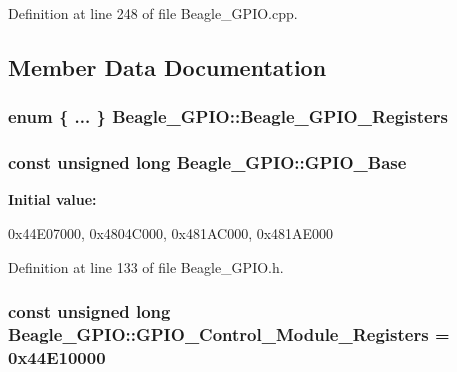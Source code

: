 \-Definition at line 248 of file \-Beagle\-\_\-\-G\-P\-I\-O.\-cpp.



\subsection{\-Member \-Data \-Documentation}
\hypertarget{class_beagle___g_p_i_o_a9f75d6e93d767194192f573ded387976}{
\subsubsection[{\-Beagle\-\_\-\-G\-P\-I\-O\-\_\-\-Registers}]{\setlength{\rightskip}{0pt plus 5cm}enum \{ ... \}   {\bf \-Beagle\-\_\-\-G\-P\-I\-O\-::\-Beagle\-\_\-\-G\-P\-I\-O\-\_\-\-Registers}}}\label{class_beagle___g_p_i_o_a9f75d6e93d767194192f573ded387976}
\hypertarget{class_beagle___g_p_i_o_ab259232b938bf1892836737c07610384}{
\subsubsection[{\-G\-P\-I\-O\-\_\-\-Base}]{\setlength{\rightskip}{0pt plus 5cm}const unsigned long {\bf \-Beagle\-\_\-\-G\-P\-I\-O\-::\-G\-P\-I\-O\-\_\-\-Base}}}\label{class_beagle___g_p_i_o_ab259232b938bf1892836737c07610384}
{\bfseries \-Initial value\-:}
\begin{DoxyCode}
 
{
        0x44E07000,     
        0x4804C000,     
        0x481AC000,     
        0x481AE000      
}
\end{DoxyCode}


\-Definition at line 133 of file \-Beagle\-\_\-\-G\-P\-I\-O.\-h.

\hypertarget{class_beagle___g_p_i_o_a45dea13988842b47f592806fd15f1262}{
\subsubsection[{\-G\-P\-I\-O\-\_\-\-Control\-\_\-\-Module\-\_\-\-Registers}]{\setlength{\rightskip}{0pt plus 5cm}const unsigned long {\bf \-Beagle\-\_\-\-G\-P\-I\-O\-::\-G\-P\-I\-O\-\_\-\-Control\-\_\-\-Module\-\_\-\-Registers} = 0x44\-E10000}}\label{class_beagle___g_p_i_o_a45dea13988842b47f592806fd15f1262}


